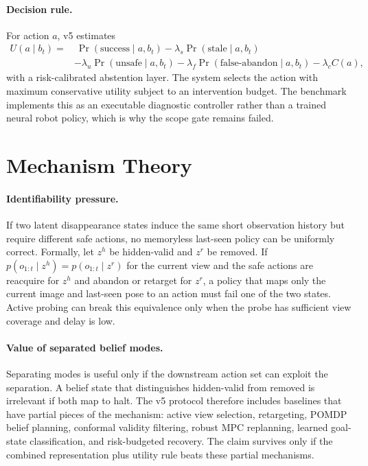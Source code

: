 \documentclass{article}
\begin{document}
\paragraph{Decision rule.}
For action $a$, v5 estimates
\begin{align*}
U(a \mid b_t)
=&\ \Pr(\text{success}\mid a,b_t)
- \lambda_s \Pr(\text{stale}\mid a,b_t)\\
&- \lambda_u \Pr(\text{unsafe}\mid a,b_t)
- \lambda_f \Pr(\text{false-abandon}\mid a,b_t)
- \lambda_c C(a),
\end{align*}
with a risk-calibrated abstention layer. The system selects the action with maximum conservative utility subject to an intervention budget. The benchmark implements this as an executable diagnostic controller rather than a trained neural robot policy, which is why the scope gate remains failed.

\section{Mechanism Theory}
\paragraph{Identifiability pressure.}
If two latent disappearance states induce the same short observation history but require different safe actions, no memoryless last-seen policy can be uniformly correct. Formally, let $z^h$ be hidden-valid and $z^r$ be removed. If $p(o_{1:t}\mid z^h)=p(o_{1:t}\mid z^r)$ for the current view and the safe actions are reacquire for $z^h$ and abandon or retarget for $z^r$, a policy that maps only the current image and last-seen pose to an action must fail one of the two states. Active probing can break this equivalence only when the probe has sufficient view coverage and delay is low.

\paragraph{Value of separated belief modes.}
Separating modes is useful only if the downstream action set can exploit the separation. A belief state that distinguishes hidden-valid from removed is irrelevant if both map to halt. The v5 protocol therefore includes baselines that have partial pieces of the mechanism: active view selection, retargeting, POMDP belief planning, conformal validity filtering, robust MPC replanning, learned goal-state classification, and risk-budgeted recovery. The claim survives only if the combined representation plus utility rule beats these partial mechanisms.
\end{document}
